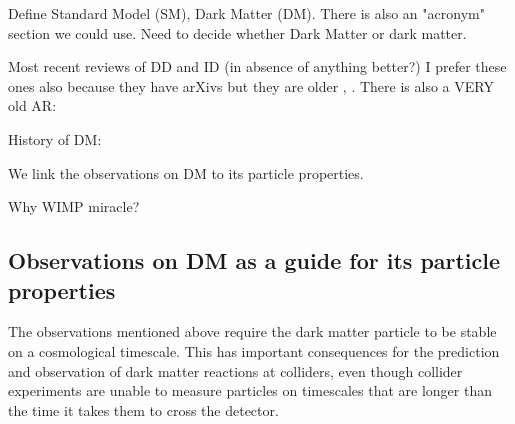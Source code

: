 Define Standard Model (SM), Dark Matter (DM). There is also an "acronym" section we could use. 
Need to decide whether Dark Matter or dark matter.

Most recent reviews of DD and ID (in absence of anything better?)
\cite{DMDD_NaturePhysics}
\cite{DMID_NaturePhysics}
I prefer these ones also because they have arXivs but they are older \cite{Gaskins:2016cha}, \cite{0954-3899-43-1-013001}. There is also a VERY old AR: \cite{doi:10.1146/annurev.nucl.54.070103.181244}

History of DM: ~\cite{Bertone:2016nfn}



We link the observations on DM to its particle properties.

Why WIMP miracle?

\subsection{Observations on DM as a guide for its particle properties}
\label{sec:DMObservations}


The observations mentioned above require the dark matter particle to be stable on a cosmological timescale. This has important consequences for the prediction and observation of dark matter reactions at colliders, even though collider experiments are unable to measure particles on timescales that are longer than the time it takes them to cross the detector. 

\begin{marginnote}[]
\end{marginnote}

